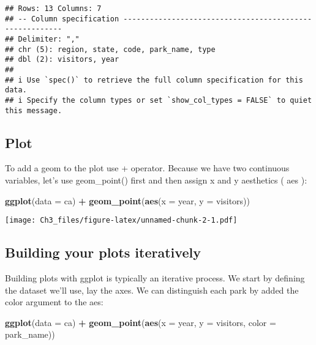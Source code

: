 \documentclass[
]{article}
\newenvironment{Shaded}{\begin{snugshade}}{\end{snugshade}}
\newcommand{\AttributeTok}[1]{\textcolor[rgb]{0.13,0.29,0.53}{#1}}
\newcommand{\FunctionTok}[1]{\textcolor[rgb]{0.13,0.29,0.53}{\textbf{#1}}}
\newcommand{\NormalTok}[1]{#1}
\newcommand{\SpecialCharTok}[1]{\textcolor[rgb]{0.81,0.36,0.00}{\textbf{#1}}}
\begin{document}
\begin{verbatim}
## Rows: 13 Columns: 7
## -- Column specification --------------------------------------------------------
## Delimiter: ","
## chr (5): region, state, code, park_name, type
## dbl (2): visitors, year
## 
## i Use `spec()` to retrieve the full column specification for this data.
## i Specify the column types or set `show_col_types = FALSE` to quiet this message.
\end{verbatim}

\subsection{Plot}\label{plot}

To add a geom to the plot use + operator. Because we have two continuous
variables, let's use geom\_point() first and then assign x and y
aesthetics ( aes ):

\begin{Shaded}
\begin{Highlighting}[]
\FunctionTok{ggplot}\NormalTok{(}\AttributeTok{data =}\NormalTok{ ca) }\SpecialCharTok{+}
\FunctionTok{geom\_point}\NormalTok{(}\FunctionTok{aes}\NormalTok{(}\AttributeTok{x =}\NormalTok{ year, }\AttributeTok{y =}\NormalTok{ visitors))}
\end{Highlighting}
\end{Shaded}

\texttt{[image: Ch3\_files/figure-latex/unnamed-chunk-2-1.pdf]}

\subsection{Building your plots
iteratively}\label{building-your-plots-iteratively}

Building plots with ggplot is typically an iterative process. We start
by defining the dataset we'll use, lay the axes. We can distinguish each
park by added the color argument to the aes:

\begin{Shaded}
\begin{Highlighting}[]
\FunctionTok{ggplot}\NormalTok{(}\AttributeTok{data =}\NormalTok{ ca) }\SpecialCharTok{+}
\FunctionTok{geom\_point}\NormalTok{(}\FunctionTok{aes}\NormalTok{(}\AttributeTok{x =}\NormalTok{ year, }\AttributeTok{y =}\NormalTok{ visitors, }\AttributeTok{color =}\NormalTok{ park\_name))}
\end{Highlighting}
\end{Shaded}
\end{document}
